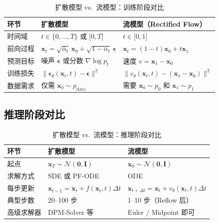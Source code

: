 \documentclass[a4paper]{article}
\begin{document}
\begin{table}[H]
\centering
\caption{扩散模型 vs.\ 流模型：训练阶段对比}
\begin{tabular}{@{} p{3.8cm} p{5cm} p{5cm} @{}}
\toprule
\textbf{环节} & \textbf{扩散模型} & \textbf{流模型（Rectified Flow）} \\
\midrule
时间域 & $t \in \{0, \ldots, T\}$ 或 ${[}0, T{]}$ & $t \in {[}0, 1{]}$ \\
前向过程 & $\mathbf{x}_t = \sqrt{\bar\alpha_t}\,\mathbf{x}_0 + \sqrt{1-\bar\alpha_t}\,\boldsymbol{\epsilon}$ & $\mathbf{x}_t = (1-t)\mathbf{x}_0 + t\mathbf{x}_1$ \\
预测目标 & 噪声 $\boldsymbol{\epsilon}$ 或分数 $\nabla\log p_t$ & 速度 $v = \mathbf{x}_1 - \mathbf{x}_0$ \\
训练损失 & $\|\boldsymbol{\epsilon}_\theta(\mathbf{x}_t,t) - \boldsymbol{\epsilon}\|^2$ & $\|v_\theta(\mathbf{x}_t,t) - (\mathbf{x}_1-\mathbf{x}_0)\|^2$ \\
数据需求 & 仅需 $\mathbf{x}_0 \sim p_{\text{data}}$ & 需要 $\mathbf{x}_0 \sim p_0$ 和 $\mathbf{x}_1 \sim p_1$ \\
\bottomrule
\end{tabular}
\end{table}

\subsection{推理阶段对比}

\begin{table}[H]
\centering
\caption{扩散模型 vs.\ 流模型：推理阶段对比}
\begin{tabular}{@{} p{3.8cm} p{5cm} p{5cm} @{}}
\toprule
\textbf{环节} & \textbf{扩散模型} & \textbf{流模型} \\
\midrule
起点 & $\mathbf{x}_T \sim \mathcal{N}(\mathbf{0},\mathbf{I})$ & $\mathbf{x}_0 \sim \mathcal{N}(\mathbf{0},\mathbf{I})$ \\
求解方式 & SDE 或 PF-ODE & ODE \\
每步更新 & $\mathbf{x}_{t-1} = \mathbf{x}_t + f(\mathbf{x}_t,t)\Delta t$ & $\mathbf{x}_{t+\Delta t} = \mathbf{x}_t + v_\theta(\mathbf{x}_t,t)\Delta t$ \\
典型步数 & 20--100 步 & 1--10 步（Reflow 后） \\
高级求解器 & DPM-Solver 等 & Euler / Midpoint 即可 \\
\bottomrule
\end{tabular}
\end{table}
\end{document}
